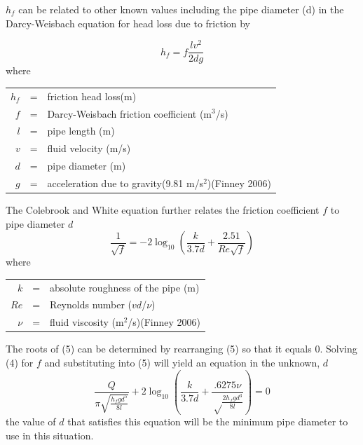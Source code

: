 \documentclass[titlepage,11pt]{article}
\begin{document}
$h_f$ can be related to other known values including the pipe
diameter (d) in the Darcy-Weisbach equation for head loss due to
friction by
\begin{singlespace}
\begin{equation}
h_f=f\frac{lv^2}{2dg}
\end{equation}
where
\begin{center}
\begin{tabular}{rcl}
$h_f$&=&friction head loss(m)\\
$f$&=&Darcy-Weisbach friction coefficient (m$^3$/s)\\
$l$ &=&pipe length (m)\\
$v$&=&fluid velocity (m/s)\\
$d$&=&pipe diameter (m)\\
$g$&=&acceleration due to gravity(9.81 m/s$^2$)(Finney 2006)
\end{tabular}
\end{center}
\end{singlespace}

The Colebrook and White equation further relates  the friction
coefficient $f$ to pipe diameter $d$
\begin{equation}
\frac{1}{\sqrt{f}}=-2\log_{10}\left(\frac{k}{3.7d}+\frac{2.51}{Re\sqrt{f}}\right)
\end{equation}
where
\begin{center}
\begin{tabular}{rcl}
$k$&=& absolute roughness of the pipe (m)\\
$Re$&=& Reynolds number ($vd$/$\nu$)\\
$\nu$&=& fluid viscosity (m$^2$/s)(Finney 2006) \\
\end{tabular}
\end{center}

The roots of (5) can be determined by rearranging (5) so that it
equals $0$. Solving (4) for $f$ and substituting into (5) will yield
an equation in the unknown, $d$
\begin{equation}
\frac{Q}{\pi\sqrt{\frac{h_fgd^5}{8l}}}+2\log_{10}\left(\frac{k}{3.7d}+\frac{.6275\nu}{\sqrt\frac{2h_fgd^3}{8l}}\right)=0
\end{equation}
the value of $d$ that satisfies this equation will be the minimum
pipe diameter to use in this situation.
\end{document}
